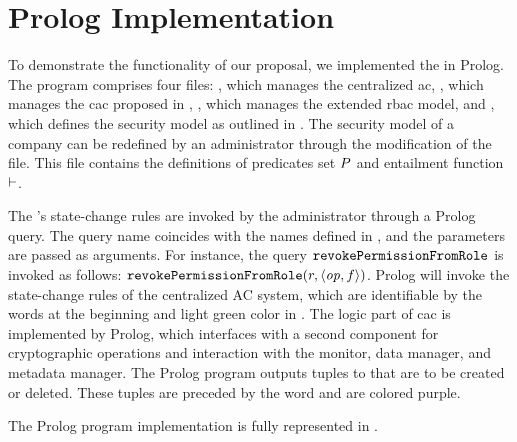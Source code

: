 \section{Prolog Implementation}
\label{sec:implementation.prolog}

To demonstrate the functionality of our proposal, we implemented the \erbac in Prolog. The program comprises four files: , which manages the centralized \gls{ac}, , which manages the \gls{cac} proposed in , , which manages the extended \gls{rbac} model, and , which defines the security model as outlined in . The security model of a company can be redefined by an administrator through the modification of the  file. This file contains the definitions of predicates set \( P \) and entailment function \( \vdash \).

The \erbac's state-change rules are invoked by the administrator through a Prolog query. The query name coincides with the names defined in , and the parameters are passed as arguments. For instance, the query \( \mathtt{revokePermissionFromRole} \) is invoked as follows: \( \mathtt{revokePermissionFromRole}(r, \langle \mathit{op}, f \rangle) \). Prolog will invoke the state-change rules of the centralized AC system, which are identifiable by the words \textcode{[TRADIT]} at the beginning and light green color in . The logic part of \gls{cac} is implemented by Prolog, which interfaces with a second component for cryptographic operations and interaction with the monitor, data manager, and metadata manager. The Prolog program outputs tuples to  that are to be created or deleted. These tuples are preceded by the word \textcode{[CRYPT]} and are colored purple.

The Prolog program implementation is fully represented in .



